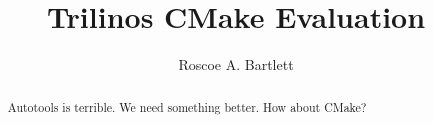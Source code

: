 \documentclass[pdf,ps2pdf,11pt]{SANDreport}
\title{
Trilinos CMake Evaluation
}
\author{Roscoe A. Bartlett}
\date{}
\begin{document}
\raggedright

\maketitle

%

%
\begin{abstract}
%
Autotools is terrible. We need something better.  How about CMake?
%
\end{abstract}
%

%
%
%

%
\tableofcontents


\end{document}
